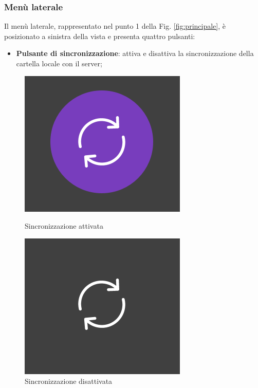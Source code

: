 \subsubsection{Menù laterale}
\label{sec:menu}
Il menù laterale, rappresentato nel punto 1 della Fig. \ref{fig:principale}, è posizionato a sinistra della vista e presenta quattro pulsanti:
\begin{itemize}
\item \textbf{Pulsante di sincronizzazione}: attiva e disattiva la sincronizzazione della cartella locale con il server; \
\end{itemize}
\begin{figure}[H]
\centering
\begin{minipage}[b]{0.45\linewidth}
\centering
\includegraphics[scale=0.5]{components/img/SyncA.png}
\caption{Sincronizzazione attivata}
\label{fig:PsyncA}
\end{minipage}
\quad
\begin{minipage}[b]{0.45\linewidth}
\centering
\includegraphics[scale=0.5]{components/img/SyncD.png}
\caption{Sincronizzazione disattivata}
\label{fig:PsyncD}
\end{minipage}
\end{figure}
